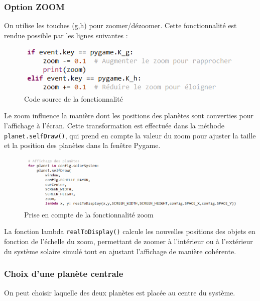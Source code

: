 \documentclass[a4paper, 12pt]{article}
\begin{document}
\subsubsection{Option ZOOM}
On utilise les touches (g,h) pour zoomer/dézoomer. Cette fonctionnalité est rendue possible par les lignes suivantes :

	\begin{figure}[H]
		\centering
		\includegraphics[width=0.4\linewidth]{img/optionZoom.png}
		\caption{\label{fig: Source} Code source de la fonctionnalité}  
	\end{figure}

Le zoom influence la manière dont les positions des planètes sont converties pour l'affichage à l'écran. Cette transformation est effectuée dans la méthode \texttt{planet.selfDraw()}, qui prend en compte la valeur du zoom pour ajuster la taille et la position des planètes dans la fenêtre Pygame.

	\begin{figure}[H]
		\centering
		\includegraphics[width=0.5\linewidth]{img/priseEnCompte.png}
		\caption{\label{fig: priseEnCompte} Prise en compte de la fonctionnalité zoom}  
	\end{figure}
	
La fonction lambda \texttt{realToDisplay()} calcule les nouvelles positions des objets en fonction de l'échelle du zoom, permettant de zoomer à l'intérieur ou à l'extérieur du système solaire simulé tout en ajustant l'affichage de manière cohérente. 

\subsubsection{Choix d'une planète centrale}
On peut choisir laquelle des deux planètes est placée au centre du système.
\end{document}
